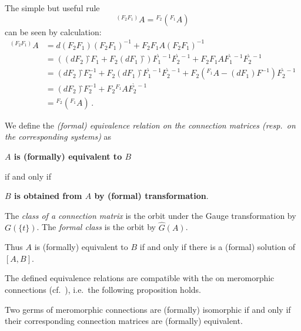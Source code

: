 \begin{rem}\label{rem:distributingTransforamtionRule}
  The simple but useful rule
  \[
    {}^{(F_2F_1)}\!A =
    {}^{F_2}\!\left({}^{F_1}\!A\right)
  \]
  can be seen by calculation:
  \begin{align*}
    {}^{(F_2F_1)}\!A
    &= d(F_2F_1)(F_2F_1)^{-1}+F_2F_1 A(F_2F_1)^{-1}
  \\&=\left(
      \left(dF_2\right)̂F_1
      +F_2\left(dF_1\right)̂
    \right) F_1^{̀-1} F_2^{̀-1}
    +F_2F_1 A F_1^{̀-1}F_2^{̀-1}
  \\&= \left(dF_2\right)̂F_2^{-1}
     +F_2\left(dF_1\right)̂ F_1^{̀-1} F_2^{̀-1}
     +F_2
     \left(
       {}^{F_1}\!A-\left(dF_1\right)F^{-1}
     \right)
     F_2^{̀-1}
  \\&= \left(dF_2\right)̂F_2^{-1} +F_2 {}^{F_1}\!A F_2^{̀-1}
  \\&= {}^{F_2}\!\left({}^{F_1}\!A\right) \,.
  \end{align*}
\end{rem}
\begin{defn}
  We define the \emph{(formal) equivalence relation on the connection matrices
  (resp.\ on the corresponding systems)} as
  \begin{einr}
    \textbf{\boldmath$A$ is (formally) equivalent to $B$}
  \end{einr}
  if and only if
  \begin{einr}
    \textbf{\boldmath$B$ is obtained from $A$ by (formal) transformation}.
  \end{einr}
  The \emph{class of a connection matrix} is the orbit under the Gauge
  transformation by $G(\!\{t\}\!)$. The \emph{formal class} is the orbit by
  $\hat G(A)$.
  \begin{s-rem}
    Thus $A$ is (formally) equivalent to $B$ if and only if there is a (formal)
    solution of $[A,B]$.
  \end{s-rem}
  \begin{comment}
    \begin{s-rem}
      This implies also an equivalence relation and a classification on the
      systems.
    \end{s-rem}
  \end{comment}
\end{defn}

The defined equivalence relations are compatible with the  on meromorphic connections (cf.\ \cite[Lem.5.1.3]{hotta2008}),
i.e.\ the following proposition holds.
\begin{prop}
  Two germs of meromorphic connections are (formally) isomorphic if and only if
  their corresponding connection matrices are (formally) equivalent.
\end{prop}

